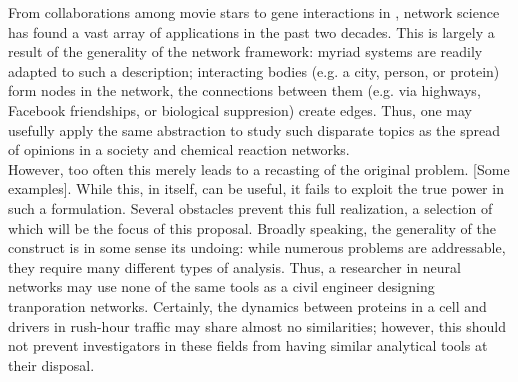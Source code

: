 \documentclass[11pt]{article}
\begin{document}
From collaborations among movie stars \cite{barbasi} to gene interactions in \cite{harvardCelegans}, network science has found a vast array of applications in the past two decades. This is largely a result of the generality of the network framework: myriad systems are readily adapted to such a description; interacting bodies (e.g. a city, person, or protein) form nodes in the network, the connections between them (e.g. via highways, Facebook friendships, or biological suppresion) create edges. Thus, one may usefully apply the same abstraction to study such disparate topics as the spread of opinions in a society and chemical reaction networks. \vspace{1mm}\\
However, too often this merely leads to a recasting of the original problem. [Some examples]. While this, in itself, can be useful, it fails to exploit the true power in such a formulation. Several obstacles prevent this full realization, a selection of which will be the focus of this proposal. Broadly speaking, the generality of the construct is in some sense its undoing: while numerous problems are addressable, they require many different types of analysis. Thus, a researcher in neural networks may use none of the same tools as a civil engineer designing tranporation networks. Certainly, the dynamics between proteins in a cell and drivers in rush-hour traffic may share almost no similarities; however, this should not prevent investigators in these fields from having similar analytical tools at their disposal.\vspace{1mm}\\ %
\end{document}
